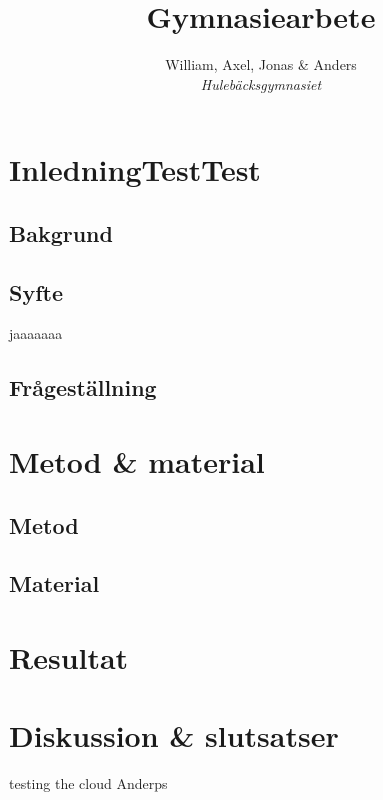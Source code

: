 \documentclass[]{article}
\title{Gymnasiearbete}
\author{William, Axel, Jonas \& Anders \\
\emph{Hulebäcksgymnasiet}}
\begin{document}
\maketitle
\section{InledningTestTest}

\subsection{Bakgrund}

\subsection{Syfte}
jaaaaaaa
\subsection{Frågeställning}

\section{Metod \& material}

\subsection{Metod}

\subsection{Material}

\section{Resultat}

\section{Diskussion \& slutsatser}
testing the cloud Anderps
\end{document}
